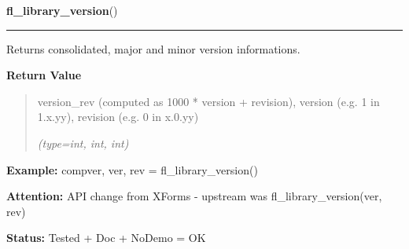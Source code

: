     \label{xformslib:flbasic:fl_library_version}

    \vspace{0.5ex}

\hspace{.8\funcindent}\begin{boxedminipage}{\funcwidth}

    \raggedright \textbf{fl\_library\_version}()

    \vspace{-1.5ex}

    \rule{\textwidth}{0.5\fboxrule}
\setlength{\parskip}{2ex}
    Returns consolidated, major and minor version informations.

\setlength{\parskip}{1ex}
      \textbf{Return Value}
    \vspace{-1ex}

      \begin{quote}
      version\_rev (computed as 1000 * version + revision), version (e.g. 1
      in 1.x.yy), revision (e.g. 0 in x.0.yy)

      {\it (type=int, int, int)}

      \end{quote}

\textbf{Example:} compver, ver, rev = fl\_library\_version()



\textbf{Attention:} API change from XForms - upstream was fl\_library\_version(ver, rev)



\textbf{Status:} Tested + Doc + NoDemo = OK



    \end{boxedminipage}

    \label{xformslib:flbasic:fl_bgn_form}

    \vspace{0.5ex}

